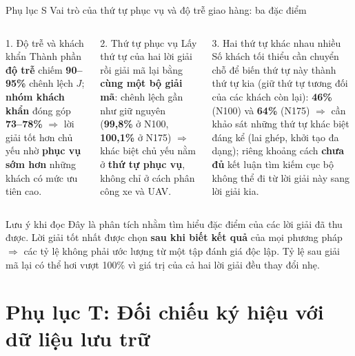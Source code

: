 \documentclass[aspectratio=169,10pt,t,xcolor={table}]{beamer}
\newcommand{\apptitle}[2]{Phụ lục #1 \textperiodcentered{} #2}
\begin{document}
\begin{frame}{\apptitle{S}{Vai trò của thứ tự phục vụ và độ trễ giao hàng: ba đặc điểm}}
\begin{columns}[T,onlytextwidth]
\begin{block}{1. Độ trễ và khách khẩn}
\scriptsize Thành phần \textbf{độ trễ} chiếm \textbf{90--95\%} chênh lệch $J$; \textbf{nhóm khách khẩn} đóng góp \textbf{73--78\%} $\Rightarrow$ lời giải tốt hơn chủ yếu nhờ \textbf{phục vụ sớm hơn} những khách có mức ưu tiên cao.
\end{block}
\begin{block}{2. Thứ tự phục vụ}
\scriptsize Lấy thứ tự của hai lời giải rồi giải mã lại bằng \textbf{cùng một bộ giải mã}: chênh lệch gần như giữ nguyên (\textbf{99,8\%} ở N100, \textbf{100,1\%} ở N175) $\Rightarrow$ khác biệt chủ yếu nằm ở \textbf{thứ tự phục vụ}, không chỉ ở cách phân công xe và UAV.
\end{block}
\begin{block}{3. Hai thứ tự khác nhau nhiều}
\scriptsize Số khách tối thiểu cần chuyển chỗ để biến thứ tự này thành thứ tự kia (giữ thứ tự tương đối của các khách còn lại): \textbf{46\%} (N100) và \textbf{64\%} (N175) $\Rightarrow$ cần khảo sát những thứ tự khác biệt đáng kể (lai ghép, khởi tạo đa dạng); riêng khoảng cách \textbf{chưa đủ} kết luận tìm kiếm cục bộ không thể đi từ lời giải này sang lời giải kia.
\end{block}
\end{columns}
\vspace{6pt}
\begin{alertblock}{Lưu ý khi đọc}
\scriptsize Đây là phân tích nhằm tìm hiểu đặc điểm của các lời giải đã thu được. Lời giải tốt nhất được chọn \textbf{sau khi biết kết quả} của mọi phương pháp $\Rightarrow$ các tỷ lệ không phải ước lượng từ một tập đánh giá độc lập. Tỷ lệ sau giải mã lại có thể hơi vượt 100\% vì giá trị của cả hai lời giải đều thay đổi nhẹ.
\end{alertblock}
\end{frame}

\section{Phụ lục T: Đối chiếu ký hiệu với dữ liệu lưu trữ}
\end{document}

